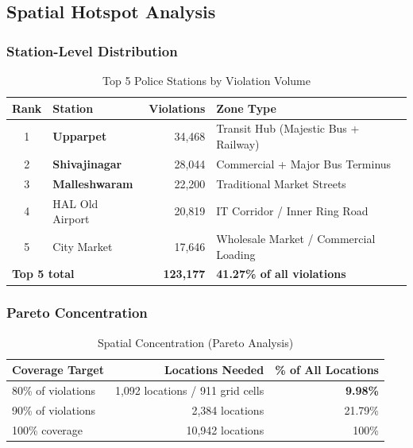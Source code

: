 \documentclass[12pt,a4paper]{article}
\begin{document}
\subsection{Spatial Hotspot Analysis}

\subsubsection{Station-Level Distribution}

\begin{table}[H]
\centering
\caption{Top 5 Police Stations by Violation Volume}
\begin{tabular}{clrp{5cm}}
\toprule
\textbf{Rank} & \textbf{Station} & \textbf{Violations} & \textbf{Zone Type} \\
\midrule
1 & \textbf{Upparpet} & 34,468 & Transit Hub (Majestic Bus + Railway) \\
2 & \textbf{Shivajinagar} & 28,044 & Commercial + Major Bus Terminus \\
3 & \textbf{Malleshwaram} & 22,200 & Traditional Market Streets \\
4 & HAL Old Airport & 20,819 & IT Corridor / Inner Ring Road \\
5 & City Market & 17,646 & Wholesale Market / Commercial Loading \\
\midrule
\multicolumn{2}{l}{\textbf{Top 5 total}} & \textbf{123,177} & \textbf{41.27\% of all violations} \\
\bottomrule
\end{tabular}
\end{table}

\subsubsection{Pareto Concentration}

\begin{table}[H]
\centering
\caption{Spatial Concentration (Pareto Analysis)}
\begin{tabular}{lrr}
\toprule
\textbf{Coverage Target} & \textbf{Locations Needed} & \textbf{\% of All Locations} \\
\midrule
\rowcolor{emerald!10} 80\% of violations & 1,092 locations / 911 grid cells & \textbf{9.98\%} \\
90\% of violations & 2,384 locations & 21.79\% \\
100\% coverage & 10,942 locations & 100\% \\
\bottomrule
\end{tabular}
\end{table}
\end{document}
